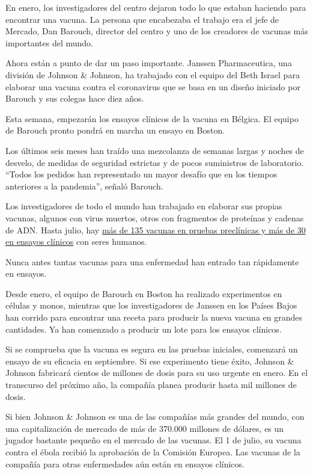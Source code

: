 En enero, los investigadores del centro dejaron todo lo que estaban
haciendo para encontrar una vacuna. La persona que encabezaba el trabajo
era el jefe de Mercado, Dan Barouch, director del centro y uno de los
creadores de vacunas más importantes del mundo.

Ahora están a punto de dar un paso importante. Janssen Pharmaceutica,
una división de Johnson \& Johnson, ha trabajado con el equipo del Beth
Israel para elaborar una vacuna contra el coronavirus que se basa en un
diseño iniciado por Barouch y sus colegas hace diez años.

Esta semana, empezarán los ensayos clínicos de la vacuna en Bélgica. El
equipo de Barouch pronto pondrá en marcha un ensayo en Boston.

Los últimos seis meses han traído una mezcolanza de semanas largas y
noches de desvelo, de medidas de seguridad estrictas y de pocos
suministros de laboratorio. ``Todos los pedidos han representado un
mayor desafío que en los tiempos anteriores a la pandemia'', señaló
Barouch.

Los investigadores de todo el mundo han trabajado en elaborar sus
propias vacunas, algunos con virus muertos, otros con fragmentos de
proteínas y cadenas de ADN. Hasta julio, hay
\href{https://www.nytimes3xbfgragh.onion/interactive/2020/science/coronavirus-vaccine-tracker.html}{más
de 135 vacunas en pruebas preclínicas y más de 30 en ensayos clínicos}
con seres humanos.

Nunca antes tantas vacunas para una enfermedad han entrado tan
rápidamente en ensayos.

Desde enero, el equipo de Barouch en Boston ha realizado experimentos en
células y monos, mientras que los investigadores de Janssen en los
Países Bajos han corrido para encontrar una receta para producir la
nueva vacuna en grandes cantidades. Ya han comenzado a producir un lote
para los ensayos clínicos.

Si se comprueba que la vacuna es segura en las pruebas iniciales,
comenzará un ensayo de su eficacia en septiembre. Si ese experimento
tiene éxito, Johnson \& Johnson fabricará cientos de millones de dosis
para su uso urgente en enero. En el transcurso del próximo año, la
compañía planea producir hasta mil millones de dosis.

Si bien Johnson \& Johnson es una de las compañías más grandes del
mundo, con una capitalización de mercado de más de 370.000 millones de
dólares, es un jugador bastante pequeño en el mercado de las vacunas. El
1 de julio, su vacuna contra el ébola recibió la aprobación de la
Comisión Europea. Las vacunas de la compañía para otras enfermedades aún
están en ensayos clínicos.

